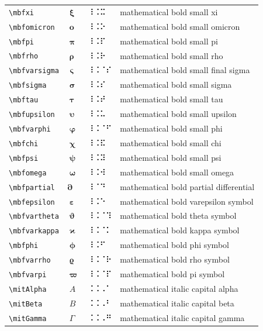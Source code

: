 \documentclass[oneside]{article}
\begin{document}
\begin{longtable}{llll}
\verb|\mbfxi| & $\mbfxi$ &  ⠸⠨⠭  & {mathematical bold small xi} \\[2ex]
\verb|\mbfomicron| & $\mbfomicron$ &  ⠸⠨⠕  & {mathematical bold small omicron} \\[2ex]
\verb|\mbfpi| & $\mbfpi$ &  ⠸⠨⠏  & {mathematical bold small pi} \\[2ex]
\verb|\mbfrho| & $\mbfrho$ &  ⠸⠨⠗  & {mathematical bold small rho} \\[2ex]
\verb|\mbfvarsigma| & $\mbfvarsigma$ &  ⠸⠨⠈⠎  & {mathematical bold small final sigma} \\[2ex]
\verb|\mbfsigma| & $\mbfsigma$ &  ⠸⠨⠎  & {mathematical bold small sigma} \\[2ex]
\verb|\mbftau| & $\mbftau$ &  ⠸⠨⠞  & {mathematical bold small tau} \\[2ex]
\verb|\mbfupsilon| & $\mbfupsilon$ &  ⠸⠨⠥  & {mathematical bold small upsilon} \\[2ex]
\verb|\mbfvarphi| & $\mbfvarphi$ &  ⠸⠨⠈⠋  & {mathematical bold small phi} \\[2ex]
\verb|\mbfchi| & $\mbfchi$ &  ⠸⠨⠯  & {mathematical bold small chi} \\[2ex]
\verb|\mbfpsi| & $\mbfpsi$ &  ⠸⠨⠽  & {mathematical bold small psi} \\[2ex]
\verb|\mbfomega| & $\mbfomega$ &  ⠸⠨⠺  & {mathematical bold small omega} \\[2ex]
\verb|\mbfpartial| & $\mbfpartial$ &  ⠸⠈⠙  & {mathematical bold partial differential} \\[2ex]
\verb|\mbfepsilon| & $\mbfepsilon$ &  ⠸⠨⠑  & {mathematical bold varepsilon symbol} \\[2ex]
\verb|\mbfvartheta| & $\mbfvartheta$ &  ⠸⠨⠈⠹  & {mathematical bold theta symbol} \\[2ex]
\verb|\mbfvarkappa| & $\mbfvarkappa$ &  ⠸⠨⠈⠅  & {mathematical bold kappa symbol} \\[2ex]
\verb|\mbfphi| & $\mbfphi$ &  ⠸⠨⠋  & {mathematical bold phi symbol} \\[2ex]
\verb|\mbfvarrho| & $\mbfvarrho$ &  ⠸⠨⠈⠗  & {mathematical bold rho symbol} \\[2ex]
\verb|\mbfvarpi| & $\mbfvarpi$ &  ⠸⠨⠈⠏  & {mathematical bold pi symbol} \\[2ex]
\verb|\mitAlpha| & $\mitAlpha$ &  ⠨⠨⠠⠁  & {mathematical italic capital alpha} \\[2ex]
\verb|\mitBeta| & $\mitBeta$ &  ⠨⠨⠠⠃  & {mathematical italic capital beta} \\[2ex]
\verb|\mitGamma| & $\mitGamma$ &  ⠨⠨⠠⠛  & {mathematical italic capital gamma} \\[2ex]

\end{longtable}
\end{document}
